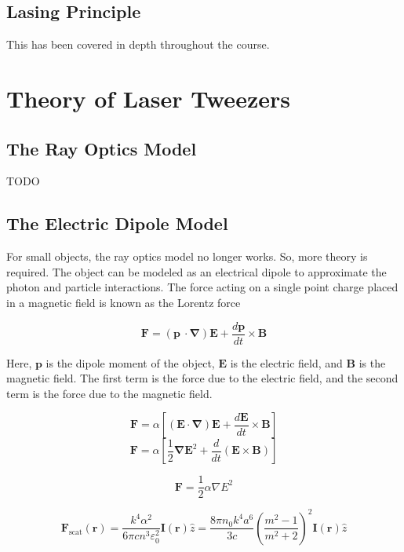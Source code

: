\documentclass{article}
\begin{document}
\subsection*{Lasing Principle}

This has been covered in depth throughout the course. 




\section*{Theory of Laser Tweezers}


\subsection*{The Ray Optics Model}

TODO


\subsection*{The Electric Dipole Model}

For small objects, the ray optics model no longer works. So, more theory is required. The object can be modeled as an electrical dipole to approximate the photon and particle interactions. The force acting on a single point charge placed in a magnetic field is known as the Lorentz force \cite{UToronto}

\[ \mathbf{F} = (\mathbf{p}\ \cdot\mathbf{\nabla})\mathbf{E} + \frac{d\mathbf{p}}{dt}\times\mathbf{B} \]

Here, $\mathbf{p}$ is the dipole moment of the object, $\mathbf{E}$ is the electric field, and $\mathbf{B}$ is the magnetic field. The first term is the force due to the electric field, and the second term is the force due to the magnetic field.

\[ \mathbf{F} = \alpha\left[ (\mathbf{E}\cdot\mathbf{\nabla})\mathbf{E} + \frac{d\mathbf{E}}{dt}\times\mathbf{B} \right]  \]
\[ \mathbf{F} = \alpha\left[ \frac{1}{2}\mathbf{\nabla}\mathbf{E}^2 + \frac{d}{dt}(\mathbf{E}\times\mathbf{B}) \right]  \]

\[ \mathbf{F} = \frac{1}{2}\alpha\nabla E^2 \]

\[ \mathbf{F}_\text{scat}(\mathbf{r}) = \frac{k^4\alpha^2}{6\pi cn^3\varepsilon_0^2}\mathbf{I}(\mathbf{r})\hat{z} = \frac{8\pi n_0k^4a^6}{3c}\left( \frac{m^2-1}{m^2+2} \right)^2\mathbf{I}(\mathbf{r})\hat{z}  \]
\end{document}
